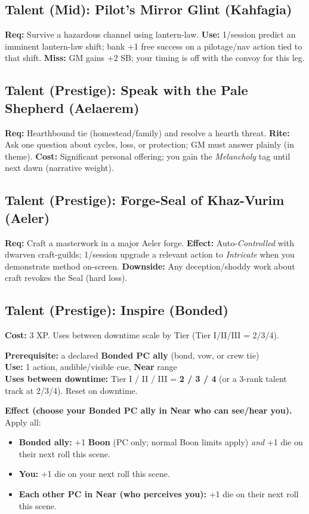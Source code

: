 \subsection{Talent (Mid): Pilot's Mirror Glint (Kahfagia)}
\textbf{Req:} Survive a hazardous channel using lantern-law.
\textbf{Use:} 1/session predict an imminent lantern-law shift; bank +1 free success on a pilotage/nav action tied to that shift.
\textbf{Miss:} GM gains +2 SB; your timing is off with the convoy for this leg.

\subsection{Talent (Prestige): Speak with the Pale Shepherd (Aelaerem)}
\textbf{Req:} Hearthbound tie (homestead/family) and resolve a hearth threat.
\textbf{Rite:} Ask one question about cycles, loss, or protection; GM must answer plainly (in theme).
\textbf{Cost:} Significant personal offering; you gain the \emph{Melancholy} tag until next dawn (narrative weight).

\subsection{Talent (Prestige): Forge-Seal of Khaz-Vurim (Aeler)}
\textbf{Req:} Craft a masterwork in a major Aeler forge.
\textbf{Effect:} Auto-\emph{Controlled} with dwarven craft-guilds; 1/session upgrade a relevant action to \emph{Intricate} when you demonstrate method on-screen.
\textbf{Downside:} Any deception/shoddy work about craft revokes the Seal (hard loss).

\subsection{Talent (Prestige): Inspire (Bonded)}
\textbf{Cost:} 3 XP. Uses between downtime scale by Tier (Tier I/II/III = 2/3/4).

\textbf{Prerequisite:} a declared \textbf{Bonded PC ally} (bond, vow, or crew tie) \\
\textbf{Use:} 1 action, audible/visible cue, \textbf{Near} range \\
\textbf{Uses between downtime:} Tier I / II / III = \textbf{2 / 3 / 4} (or a 3-rank talent track at 2/3/4). Reset on downtime.

\textbf{Effect (choose your Bonded PC ally in Near who can see/hear you).}
Apply all:
\begin{itemize}
  \item \textbf{Bonded ally:} +1 \textbf{Boon} (PC only; normal Boon limits apply) \emph{and} +1 die on their next roll this scene.
  \item \textbf{You:} +1 die on your next roll this scene.
  \item \textbf{Each other PC in Near (who perceives you):} +1 die on their next roll this scene.
\end{itemize}

